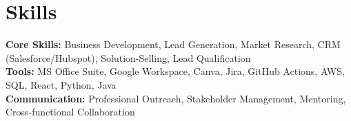 \documentclass[11pt]{article}       %
\begin{document}

\vspace{-18.5pt}


\section*{Skills}
\textbf{Core Skills:} Business Development, Lead Generation, Market Research, CRM (Salesforce/Hubspot), Solution-Selling, Lead Qualification\\
\textbf{Tools:} MS Office Suite, Google Workspace, Canva, Jira, GitHub Actions, AWS, SQL, React, Python, Java\\
\textbf{Communication:} Professional Outreach, Stakeholder Management, Mentoring, Cross-functional Collaboration\\

\vspace{-6.5pt}
\end{document}
